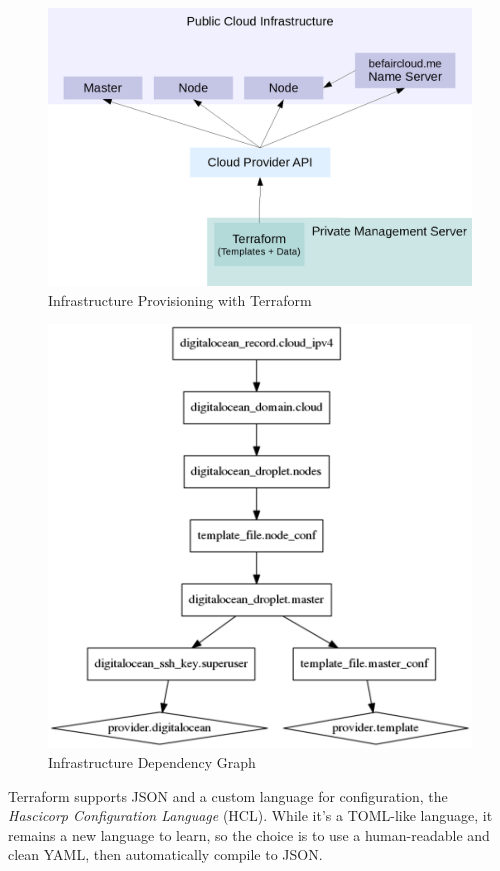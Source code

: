 \begin{figure}[htbp]
\centering
\includegraphics{media/ch4-terraform.png}
\caption{Infrastructure Provisioning with Terraform}
\end{figure}

\begin{figure}[htbp]
\centering
\includegraphics{media/ch4-graph.png}
\caption{Infrastructure Dependency Graph}
\end{figure}

Terraform supports JSON and a custom language for configuration, the
\emph{Hascicorp Configuration Language} (HCL). While it's a TOML-like
language, it remains a new language to learn, so the choice is to use a
human-readable and clean YAML, then automatically compile to JSON.

